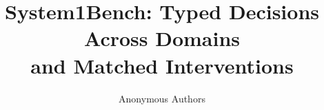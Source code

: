 \documentclass{article}
\title{System1Bench: Typed Decisions Across Domains\\and Matched Interventions}
\author{Anonymous Authors}
\begin{document}
\maketitle
\begin{abstract}

\end{abstract}





\FloatBarrier

\FloatBarrier

\FloatBarrier

\FloatBarrier

\FloatBarrier


\FloatBarrier




\label{main-end}
\FloatBarrier


\clearpage
\appendix

\end{document}
